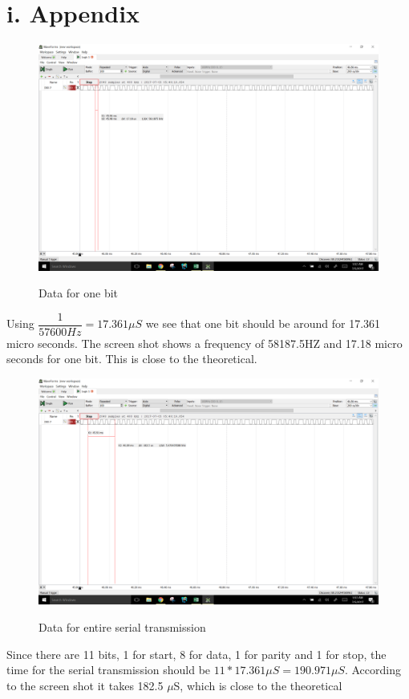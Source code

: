 \documentclass[11pt]{article}
\theoremstyle{plain}
\theoremstyle{definition}
\begin{document}
\newpage
\section*{i. Appendix}
\begin{figure}[H]
	\centering
	\includegraphics[width=\textwidth]{4C1}
	\label{fig:c}
	\caption{Data for one bit}
\end{figure}
Using $\dfrac{1}{57600 Hz} = 17.361 \mu S$ we see that one bit should be around for 17.361 micro seconds. The screen shot shows a frequency of 58187.5HZ and 17.18 micro seconds for one bit. This is close to the theoretical. 
\begin{figure}[H]
	\centering
	\includegraphics[width=\textwidth]{4c2}
	\label{fig:c}
	\caption{Data for entire serial transmission}
\end{figure}
Since there are 11 bits, 1 for start, 8 for data, 1 for parity and 1 for stop, the time for the serial transmission should be $11 * 17.361 \mu S = 190.971 \mu S$. According to the screen shot it takes 182.5 $\mu$S, which is close to the theoretical
\end{document}
